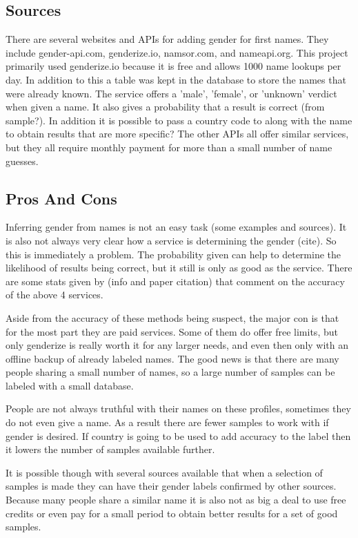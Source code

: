 \documentclass{article}
\begin{document}
\subsection{Sources}
There are several websites and APIs for adding gender for first names. They include gender-api.com, genderize.io, namsor.com, and nameapi.org. This project primarily used genderize.io because it is free and allows 1000 name lookups per day. In addition to this a table was kept in the database to store the names that were already known. The service offers a 'male', 'female', or 'unknown' verdict when given a name. It also gives a probability that a result is correct (from sample?). In addition it is possible to pass a country code to along with the name to obtain results that are more specific? The other APIs all offer similar services, but they all require monthly payment for more than a small number of name guesses.

\subsection{Pros And Cons}
Inferring gender from names is not an easy task (some examples and sources). It is also not always very clear how a service is determining the gender (cite). So this is immediately a problem. The probability given can help to determine the likelihood of results being correct, but it still is only as good as the service. There are some stats given by (info and paper citation) that comment on the accuracy of the above 4 services.

Aside from the accuracy of these methods being suspect, the major con is that for the most part they are paid services. Some of them do offer free limits, but only genderize is really worth it for any larger needs, and even then only with an offline backup of already labeled names. The good news is that there are many people sharing a small number of names, so a large number of samples can be labeled with a small database.

People are not always truthful with their names on these profiles, sometimes they do not even give a name. As a result there are fewer samples to work with if gender is desired. If country is going to be used to add accuracy to the label then it lowers the number of samples available further.

It is possible though with several sources available that when a selection of samples is made they can have their gender labels confirmed by other sources. Because many people share a similar name it is also not as big a deal to use free credits or even pay for a small period to obtain better results for a set of good samples.
\end{document}
